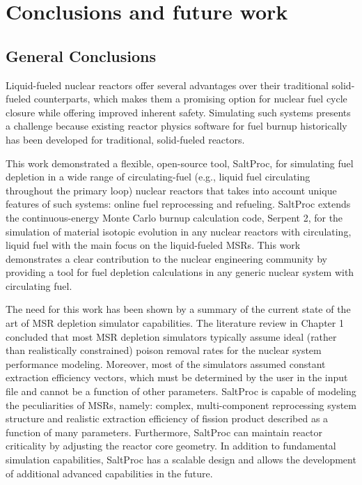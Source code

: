 \chapter{Conclusions and future work}

\section{General Conclusions}
Liquid-fueled nuclear reactors offer several advantages over their traditional 
solid-fueled counterparts, which makes them a promising option for nuclear 
fuel cycle closure while offering improved inherent safety. Simulating such 
systems presents a challenge because existing reactor physics software for 
fuel burnup historically has been developed for traditional, solid-fueled 
reactors.

This work demonstrated a flexible, open-source tool, SaltProc, for 
simulating fuel depletion in a wide range of circulating-fuel (e.g., liquid 
fuel circulating throughout the primary loop) nuclear reactors that takes into 
account unique features of such systems: online fuel reprocessing 
and refueling. SaltProc extends the continuous-energy Monte Carlo burnup 
calculation code, Serpent 2, for the simulation of material isotopic evolution 
in any nuclear reactors with circulating, liquid fuel with the main focus on 
the liquid-fueled \glspl{MSR}. This work demonstrates a clear contribution to 
the nuclear engineering community by providing a tool for fuel depletion 
calculations in any generic nuclear system with circulating fuel.

The need for this work has been shown by a summary of the current state of the 
art of \gls{MSR} depletion simulator capabilities. The literature review in 
Chapter 1 concluded that most \gls{MSR} depletion simulators typically assume 
ideal (rather than realistically constrained) poison removal rates for the 
nuclear system performance modeling. Moreover, most of the simulators assumed 
constant extraction efficiency vectors, which must be determined by the user 
in the input file and cannot be a function of other parameters. SaltProc is 
capable of modeling the peculiarities of \glspl{MSR}, namely:
complex, multi-component reprocessing system structure and realistic 
extraction efficiency of fission product described as a function of 
many parameters. Furthermore, SaltProc can maintain reactor criticality by 
adjusting the reactor core geometry. In addition to fundamental simulation 
capabilities, SaltProc has a scalable design and allows the development of 
additional advanced capabilities in the future.


